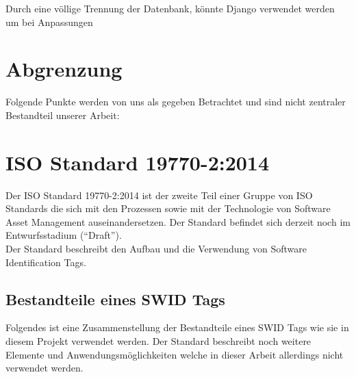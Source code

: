 Durch eine völlige Trennung der Datenbank, könnte Django verwendet werden um bei
Anpassungen

\section{Abgrenzung}
Folgende Punkte werden von uns als gegeben Betrachtet und sind nicht zentraler
Bestandteil unserer Arbeit:

\section{ISO Standard 19770-2:2014} 
Der ISO Standard 19770-2:2014 ist der zweite Teil einer Gruppe von ISO Standards
die sich mit den Prozessen sowie mit der Technologie von Software Asset
Management auseinandersetzen. Der Standard befindet sich derzeit noch im
Entwurfsstadium (\enquote{Draft}).\\
Der Standard beschreibt den Aufbau und die Verwendung von Software
Identification Tags.

\subsection{Bestandteile eines SWID Tags}
Folgendes ist eine Zusammenstellung der Bestandteile eines SWID Tags wie sie in
diesem Projekt verwendet werden. Der Standard beschreibt noch weitere Elemente
und Anwendungsmöglichkeiten welche in dieser Arbeit allerdings nicht verwendet
werden.

